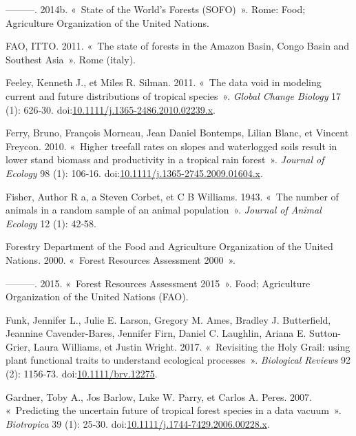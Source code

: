\documentclass[11pt,french,A4paper,extrafontsizes,onecolumn,openright]{memoir}
\begin{document}
\hypertarget{ref-FAO2014}{}
---------. 2014b. «~State of the World's Forests (SOFO)~». Rome: Food;
Agriculture Organization of the United Nations.

\hypertarget{ref-FAO2011}{}
FAO, ITTO. 2011. «~The state of forests in the Amazon Basin, Congo Basin
and Southest Asia~». Rome (italy).

\hypertarget{ref-Feeley2011}{}
Feeley, Kenneth J., et Miles R. Silman. 2011. «~The data void in
modeling current and future distributions of tropical species~».
\emph{Global Change Biology} 17 (1): 626‑30.
doi:\href{https://doi.org/10.1111/j.1365-2486.2010.02239.x}{10.1111/j.1365-2486.2010.02239.x}.

\hypertarget{ref-Ferry2010}{}
Ferry, Bruno, François Morneau, Jean Daniel Bontemps, Lilian Blanc, et
Vincent Freycon. 2010. «~Higher treefall rates on slopes and waterlogged
soils result in lower stand biomass and productivity in a tropical rain
forest~». \emph{Journal of Ecology} 98 (1): 106‑16.
doi:\href{https://doi.org/10.1111/j.1365-2745.2009.01604.x}{10.1111/j.1365-2745.2009.01604.x}.

\hypertarget{ref-Fisher1943}{}
Fisher, Author R a, a Steven Corbet, et C B Williams. 1943. «~The number
of animals in a random sample of an animal population~». \emph{Journal
of Animal Ecology} 12 (1): 42‑58.

\hypertarget{ref-FRA2000}{}
Forestry Department of the Food and Agriculture Organization of the
United Nations. 2000. «~Forest Resources Assessment 2000~».

\hypertarget{ref-FRA2015}{}
---------. 2015. «~Forest Resources Assessment 2015~». Food; Agriculture
Organization of the United Nations (FAO).

\hypertarget{ref-Funk2017}{}
Funk, Jennifer L., Julie E. Larson, Gregory M. Ames, Bradley J.
Butterfield, Jeannine Cavender-Bares, Jennifer Firn, Daniel C. Laughlin,
Ariana E. Sutton-Grier, Laura Williams, et Justin Wright. 2017.
«~Revisiting the Holy Grail: using plant functional traits to understand
ecological processes~». \emph{Biological Reviews} 92 (2): 1156‑73.
doi:\href{https://doi.org/10.1111/brv.12275}{10.1111/brv.12275}.

\hypertarget{ref-Gardner2007}{}
Gardner, Toby A., Jos Barlow, Luke W. Parry, et Carlos A. Peres. 2007.
«~Predicting the uncertain future of tropical forest species in a data
vacuum~». \emph{Biotropica} 39 (1): 25‑30.
doi:\href{https://doi.org/10.1111/j.1744-7429.2006.00228.x}{10.1111/j.1744-7429.2006.00228.x}.
\end{document}
